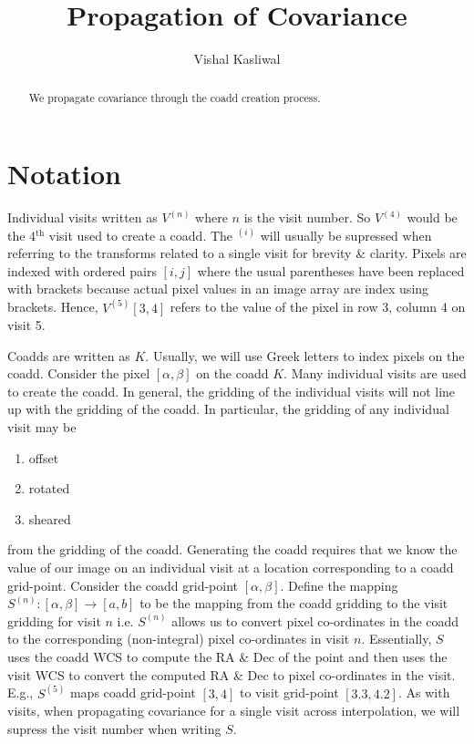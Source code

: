 \documentclass[times]{aastex6}
\begin{document}
\title{Propagation of Covariance}

\author {Vishal Kasliwal}



\begin{abstract}
We propagate covariance through the coadd creation process.
\end{abstract}

\section{Notation}
Individual visits written as $V^{(n)}$ where $n$ is the visit number. So $V^{(4)}$ would be the 4$^{\mathrm{th}}$ visit used to create a coadd. The $^{(i)}$ will usually be supressed when referring to the transforms related to a single visit for brevity \& clarity. Pixels are indexed with ordered pairs $[i,j]$ where the usual parentheses have been replaced with brackets because actual pixel values in an image array are index using brackets. Hence, $V^{(5)}[3,4]$ refers to the value of the pixel in row 3, column 4 on visit 5.

Coadds are written as $K$. Usually, we will use Greek letters to index pixels on the coadd. Consider the pixel $[\alpha,\beta]$ on the coadd $K$. Many individual visits are used to create the coadd. In general, the gridding of the individual visits will not line up with the gridding of the coadd. In particular, the gridding of any individual visit may be
\begin{enumerate}
  \item offset
  \item rotated
  \item sheared
\end{enumerate}
from the gridding of the coadd. Generating the coadd requires that we know the value of our image on an individual visit at a location corresponding to a coadd grid-point. Consider the coadd grid-point $[\alpha, \beta]$. Define the mapping $S^{(n)}: [\alpha, \beta] \rightarrow [a,b]$ to be the mapping from the coadd gridding to the visit gridding for visit $n$ i.e. $S^{(n)}$ allows us to convert pixel co-ordinates in the coadd to the corresponding (non-integral) pixel co-ordinates in visit $n$. Essentially, $S$ uses the coadd WCS to compute the RA \& Dec of the point and then uses the visit WCS to convert the computed RA \& Dec to pixel co-ordinates in the visit. E.g., $S^{(5)}$ maps coadd grid-point $[3,4]$ to visit grid-point $[3.3, 4.2]$. As with visits, when propagating covariance for a single visit across interpolation, we will supress the visit number when writing $S$.
\end{document}
